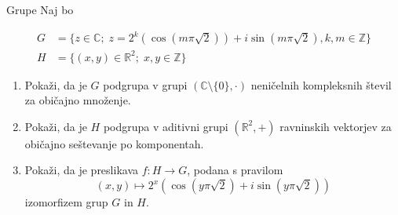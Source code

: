 \begin{frame}{Grupe}
	Naj bo
	
	\begin{align*}
		G &= \{z\in\mathbb{C}; \; z=2^k(\cos(m\pi\sqrt{2}))+i\sin(m\pi\sqrt{2}), k,m\in\mathbb{Z}\} \\
		H &= \{(x,y)\in\mathbb{R}^2;\; x,y \in \mathbb{Z}\}
	\end{align*}
	
	\begin{enumerate}
		\item
			Pokaži, da je $G$ podgrupa v grupi $ (\mathbb{C} \setminus \{0\}, \cdot )$
			neničelnih kompleksnih števil za običajno množenje.
		\item
			Pokaži, da je $H$ podgrupa v aditivni grupi $(\mathbb{R}^2,+)$
			ravninskih vektorjev za običajno seštevanje po komponentah.
		\item
			Pokaži, da je preslikava $f:H\to G$, podana s pravilom
			$$ (x,y)\mapsto  2^x(\cos(y\pi\sqrt{2})+i\sin(y\pi\sqrt{2}))$$
			izomorfizem grup $G$ in $H$.
	\end{enumerate}
\end{frame}
